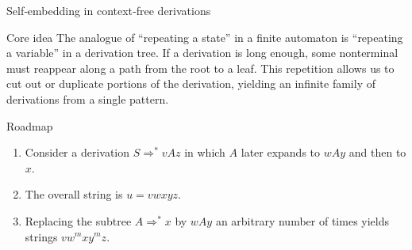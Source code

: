 \begin{frame}[t]{Self‑embedding in context‑free derivations}
  \begin{tblock}{Core idea}
    The analogue of “repeating a state” in a finite automaton is
    “repeating a variable” in a derivation tree.  If a derivation is
    long enough, some nonterminal must reappear along a path from the
    root to a leaf.  This repetition allows us to cut out or duplicate
    portions of the derivation, yielding an infinite family of
    derivations from a single pattern.
  \end{tblock}
  \begin{tblock}{Roadmap}
    \begin{enumerate}
      \item Consider a derivation $S \Rightarrow^* v A z$ in which
        $A$ later expands to $wAy$ and then to $x$.
      \item The overall string is $u = v w x y z$.
      \item Replacing the subtree $A \Rightarrow^* x$ by $wAy$ an
        arbitrary number of times yields strings $v w^m x y^m z$.
    \end{enumerate}
  \end{tblock}
  \label{fr:6.1-03}
\end{frame}


